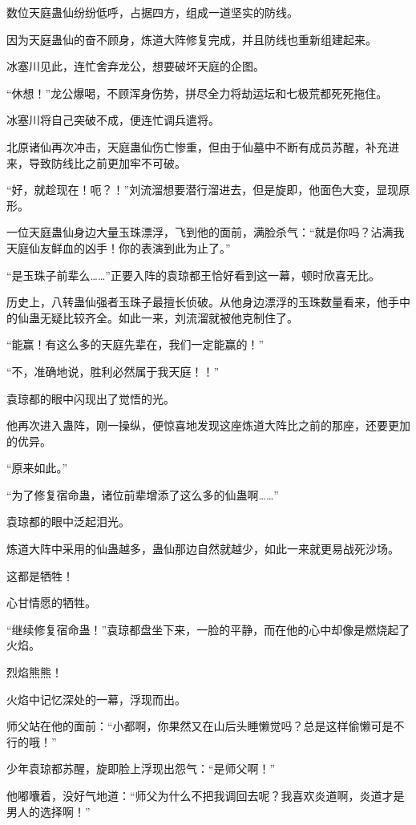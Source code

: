 \begin{this_body}
数位天庭蛊仙纷纷低呼，占据四方，组成一道坚实的防线。

因为天庭蛊仙的奋不顾身，炼道大阵修复完成，并且防线也重新组建起来。

冰塞川见此，连忙舍弃龙公，想要破坏天庭的企图。

“休想！”龙公爆喝，不顾浑身伤势，拼尽全力将劫运坛和七极荒都死死拖住。

冰塞川将自己突破不成，便连忙调兵遣将。

北原诸仙再次冲击，天庭蛊仙伤亡惨重，但由于仙墓中不断有成员苏醒，补充进来，导致防线比之前更加牢不可破。

“好，就趁现在！呃？！”刘流溜想要潜行溜进去，但是旋即，他面色大变，显现原形。

一位天庭蛊仙身边大量玉珠漂浮，飞到他的面前，满脸杀气：“就是你吗？沾满我天庭仙友鲜血的凶手！你的表演到此为止了。”

“是玉珠子前辈么……”正要入阵的袁琼都王恰好看到这一幕，顿时欣喜无比。

历史上，八转蛊仙强者玉珠子最擅长侦破。从他身边漂浮的玉珠数量看来，他手中的仙蛊无疑比较齐全。如此一来，刘流溜就被他克制住了。

“能赢！有这么多的天庭先辈在，我们一定能赢的！”

“不，准确地说，胜利必然属于我天庭！！”

袁琼都的眼中闪现出了觉悟的光。

他再次进入蛊阵，刚一操纵，便惊喜地发现这座炼道大阵比之前的那座，还要更加的优异。

“原来如此。”

“为了修复宿命蛊，诸位前辈增添了这么多的仙蛊啊……”

袁琼都的眼中泛起泪光。

炼道大阵中采用的仙蛊越多，蛊仙那边自然就越少，如此一来就更易战死沙场。

这都是牺牲！

心甘情愿的牺牲。

“继续修复宿命蛊！”袁琼都盘坐下来，一脸的平静，而在他的心中却像是燃烧起了火焰。

烈焰熊熊！

火焰中记忆深处的一幕，浮现而出。

师父站在他的面前：“小都啊，你果然又在山后头睡懒觉吗？总是这样偷懒可是不行的哦！”

少年袁琼都苏醒，旋即脸上浮现出怨气：“是师父啊！”

他嘟囔着，没好气地道：“师父为什么不把我调回去呢？我喜欢炎道啊，炎道才是男人的选择啊！”


\end{this_body}
